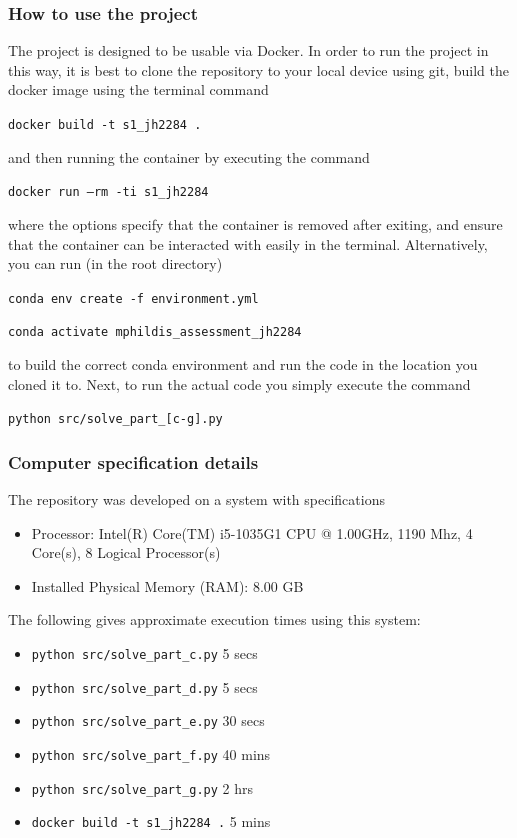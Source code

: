 \documentclass[12pt]{article}
\begin{document}
\subsubsection*{How to use the project}
The project is designed to be usable via Docker. In order to run the project in this way, it is best to clone the repository to your local device using git, build the docker
image using the terminal command

\texttt{docker build -t s1\_jh2284 .}

and then running the container by executing the command

\texttt{docker run --rm -ti s1\_jh2284}

where the options specify that the container is removed after exiting, and ensure that the container can be interacted with easily in the terminal.
Alternatively, you can run (in the root directory)

\texttt{conda env create -f environment.yml}

\texttt{conda activate mphildis\_assessment\_jh2284}

to build the correct conda environment and run the code in the location you cloned it to.
Next, to run the actual code you simply execute the command

\texttt{python src/solve\_part\_[c-g].py}

\subsubsection*{Computer specification details}

The repository was developed on a system with specifications
\begin{itemize}
  \item Processor: Intel(R) Core(TM) i5-1035G1 CPU @ 1.00GHz, 1190 Mhz, 4 Core(s), 8 Logical Processor(s)
  \item Installed Physical Memory (RAM): 8.00 GB
\end{itemize}

The following gives approximate execution times using this system:
\begin{itemize}
  \item \texttt{python src/solve\_part\_c.py} 5 secs
  \item \texttt{python src/solve\_part\_d.py} 5 secs
  \item \texttt{python src/solve\_part\_e.py} 30 secs
  \item \texttt{python src/solve\_part\_f.py} 40 mins
  \item \texttt{python src/solve\_part\_g.py} 2 hrs
  \item \texttt{docker build -t s1\_jh2284 .} 5 mins
\end{itemize}
\end{document}
